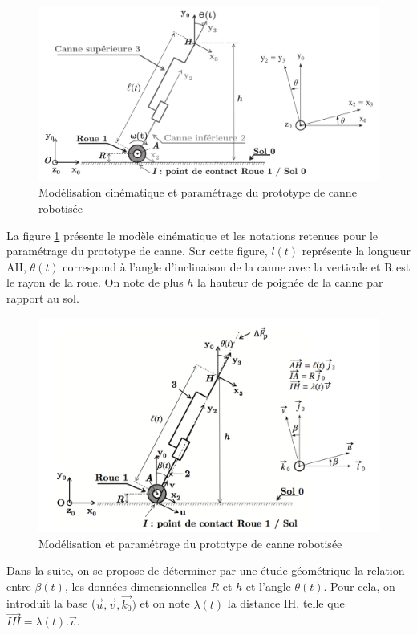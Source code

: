 \begin{figure}[!h]\centering
\includegraphics[width=0.9\linewidth]{img/fermeture_geo}
\caption{\label{ferm_geo}Modélisation cinématique et paramétrage du prototype de canne robotisée}
\end{figure}

La figure \ref{ferm_geo} présente le modèle cinématique et les notations retenues pour le paramétrage du prototype de canne. Sur cette figure, $l(t)$ représente la longueur AH, $\theta(t)$ correspond à l'angle d'inclinaison de la canne avec la verticale et R est le rayon de la roue. On note de plus $h$ la hauteur de poignée de la canne par rapport au sol.


\begin{figure}[!h]\centering
\includegraphics[width=0.9\linewidth]{img/fermeture_geo_2}
\caption{\label{ferm_geo2}Modélisation et paramétrage du prototype de canne robotisée}
\end{figure}

Dans la suite, on se propose de déterminer par une étude géométrique la relation entre $\beta(t)$, les données dimensionnelles $R$ et $h$ et l'angle $\theta(t)$. Pour cela, on introduit la base ($\vec{u},\vec{v},\vec{k_0})$ et on note $\lambda(t)$ la distance IH, telle que $\overrightarrow{IH} = \lambda(t).\vec{v}$.

